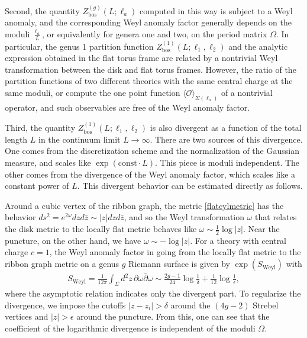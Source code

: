 \documentclass[12pt]{article}
\def\ie{\begin{equation}\begin{aligned}}
\def\fe{\end{aligned}\end{equation}}
\numberwithin{equation}{section}
\begin{document}
Second, the quantity $Z_{\text{bos}}^{(g)}(L;\ell_a)$ computed in this way is subject to a Weyl anomaly, and the corresponding Weyl anomaly factor generally depends on the moduli $\frac{\ell_a}{L}$, or equivalently for genera one and two, on the period matrix $\Omega$. In particular, the genus 1 partition function $Z_\text{bos}^{(1)}(L;\ell_1, \ell_2)$ and the analytic expression obtained in the flat torus frame are related by a nontrivial Weyl transformation between the disk and flat torus frames. However, the ratio of the partition functions of two different theories with the same central charge at the same moduli, or compute the one point function $\langle \mathcal{O}\rangle_{\Sigma(\ell_a)}$ of a nontrivial operator, and such observables are free of the Weyl anomaly factor.

Third, the quantity $Z^{(1)}_{\text{bos}}(L;\ell_1, \ell_2)$ is also divergent as a function of the total length $L$ in the continuum limit $L\rightarrow \infty$. There are two sources of this divergence. One comes from the discretization scheme and the normalization of the Gaussian measure, and scales like $\exp(\text{const}\cdot L)$. This piece is moduli independent. The other comes from the divergence of the Weyl anomaly factor, which scales like a constant power of $L$. This divergent behavior can be estimated directly as follows. 

Around a cubic vertex of the ribbon graph, the metric \eqref{flatcylmetric} has the behavior $ds^2 =e^{2\omega} dz d\bar z \sim |z| dz d\bar z$, and so the Weyl transformation $\omega$ that relates the disk metric to the locally flat metric behaves like $\omega \sim \frac{1}{2} \log|z|$. Near the puncture, on the other hand, we have $\omega \sim - \log|z|$. For a theory with central charge $c=1$, the Weyl anomaly factor in going from the locally flat metric to the ribbon graph metric on a genus $g$ Riemann surface is given by $\exp({S_\text{Weyl}})$ with
\ie\label{sweyl}
S_\text{Weyl} = \frac{1}{12\pi} \int_{\Sigma} d^2z \,\partial\omega \bar\partial\omega \sim \frac{2g-1}{24}\log \frac{1}{\delta} +\frac{1}{12} \log \frac{1}{\epsilon},
\fe
where the asymptotic relation indicates only the divergent part. To regularize the divergence, we impose the cutoffs $|z-z_i|>\delta$ around the $(4g-2)$ Strebel vertices and $|z|>\epsilon$ around the puncture. From this, one can see that the coefficient of the logarithmic divergence is independent of the moduli $\Omega$.
\end{document}
